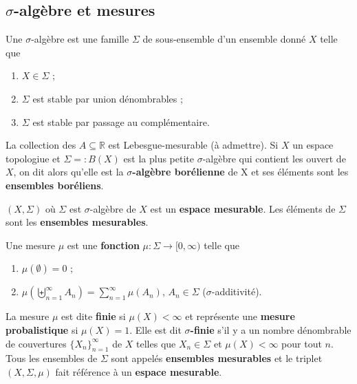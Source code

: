 \subsection{$\sigma$-algèbre et mesures}

\begin{definition}
    Une $\sigma$-algèbre est une famille $\Sigma$ de sous-ensemble d'un ensemble donné $X$ telle que
    \begin{enumerate}[label=(\roman*)]
        \item $X\in\Sigma$ ;
        \item $\Sigma$ est stable par union dénombrables ;
        \item $\Sigma$ est stable par passage au complémentaire.
    \end{enumerate}
\end{definition}

\begin{example}
    La collection des $A\subseteq\mathbb{R}$ est Lebesgue-mesurable (à admettre). Si $X$ un espace topologiue et $\Sigma =: B(X)$ est la plus petite $\sigma$-algèbre qui contient les ouvert de $X$, on dit alors qu'elle est la \textbf{$\sigma$-algèbre borélienne} de X et ses éléments sont les \textbf{ensembles boréliens}.
\end{example}

\begin{definition}
    $(X,\Sigma)$ où $\Sigma$ est $\sigma$-algèbre de $X$ est un \textbf{espace mesurable}. Les éléments de $\Sigma$ sont les \textbf{ensembles mesurables}.
\end{definition}

\begin{definition}
    Une mesure $\mu$ est une \textbf{fonction} $\mu : \Sigma\to[0,\infty)$ telle que
    \begin{enumerate}[label=(\roman*)]
        \item $\mu(\emptyset)=0$ ;
        \item $\mu(\biguplus_{n=1}^\infty A_n) = \sum_{n=1}^\infty \mu(A_n)$, $A_n\in\Sigma$ ($\sigma$-additivité).
    \end{enumerate}
\end{definition}

\begin{definition}
    La mesure $\mu$ est dite \textbf{finie} si $\mu(X)<\infty$ et représente une \textbf{mesure probalistique} si $\mu(X)=1$. Elle est dit \textbf{$\sigma$-finie} s'il y a un nombre dénombrable de couvertures $\{X_n\}_{n=1}^\infty$ de $X$ telles que $X_n\in\Sigma$ et $\mu(X)<\infty$ pour tout $n$. Tous les ensembles de $\Sigma$ sont appelés \textbf{ensembles mesurables} et le triplet $(X,\Sigma,\mu)$ fait référence à un \textbf{espace mesurable}.
\end{definition}

